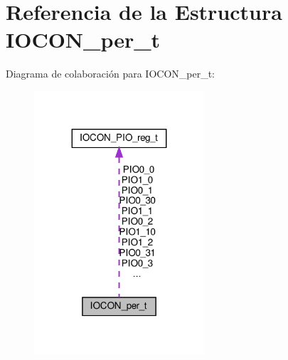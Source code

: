 \hypertarget{structIOCON__per__t}{}\section{Referencia de la Estructura I\+O\+C\+O\+N\+\_\+per\+\_\+t}
\label{structIOCON__per__t}


Diagrama de colaboración para I\+O\+C\+O\+N\+\_\+per\+\_\+t\+:\nopagebreak
\begin{figure}[H]
\begin{center}
\leavevmode
\includegraphics[width=179pt]{d4/d89/structIOCON__per__t__coll__graph}
\end{center}
\end{figure}
